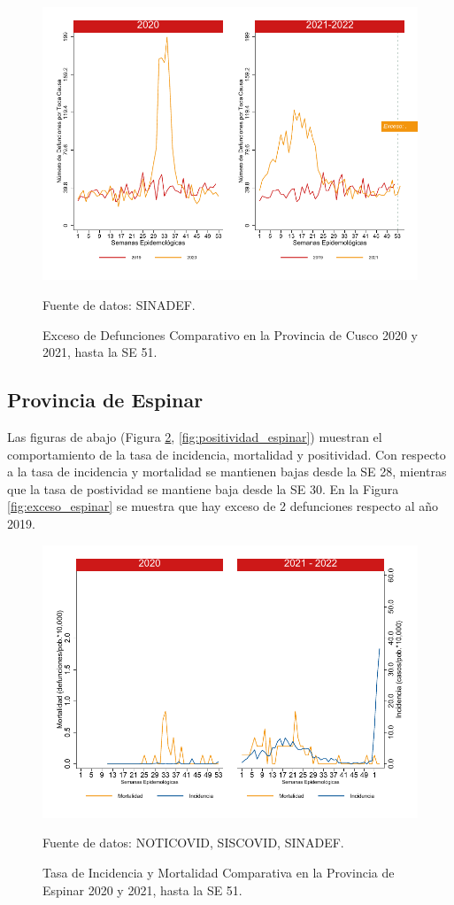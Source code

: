 \documentclass[12pt,a4paper,openany]{book}
\begin{document}
		\begin{figure}[h]
			\caption{Exceso de Defunciones Comparativo en la Provincia de Cusco  2020 y 2021, hasta la SE 51.}\label{fig:exceso_cusco}
			\begin{center}
				\includegraphics[width=0.7\linewidth]{../figuras/exceso_7}
			\end{center}
			{\footnotesize {Fuente de datos: SINADEF.}}
		\end{figure}
		
		\clearpage
		
		\subsection*{Provincia de Espinar}
		\noindent Las figuras de abajo (Figura \ref{fig:inc_mort_espinar}, \ref{fig:positividad_espinar}) muestran el comportamiento de la tasa de incidencia, mortalidad y positividad. Con respecto a la tasa de incidencia y mortalidad se mantienen bajas desde la SE 28, mientras que la tasa de postividad se mantiene baja desde la SE 30. 
		En la Figura \ref{fig:exceso_espinar} se muestra que hay exceso de 2 defunciones respecto al año 2019.
		
		\begin{figure}[h]
			\caption{Tasa de Incidencia y Mortalidad Comparativa en la Provincia de Espinar 2020 y 2021, hasta la SE 51.}\label{fig:inc_mort_espinar}
			\begin{center}
				\includegraphics[width=0.7\linewidth]{../figuras/incidencia_mortalidad_20_21_8}
			\end{center}
			{\footnotesize {Fuente de datos: NOTICOVID, SISCOVID, SINADEF.}}
		\end{figure}
		
\end{document}
